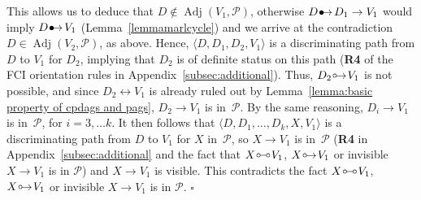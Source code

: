 \documentclass[11pt,a4paper]{article}
\newenvironment{proofof}[1][]{\begin{trivlist}
   \item[\hskip \labelsep {\bfseries Proof of #1.}]}{\hfill{}$\square$\end{trivlist}}
\DeclareMathOperator{\Adj}{Adj}
\newcommand{\g}[1][G]{\mathcal{#1}}
\newcommand{\bulletarrow}{
  \setlength{\unitlength}{1mm}
  \begin{picture}(5,1)(0,0)
    \put(0.2,0){$\bullet$}
    \put(1,0){$\rightarrow$}
  \end{picture}
}
\newcommand{\circarrow}{
  \setlength{\unitlength}{1mm}
  \begin{picture}(5,1)(0,0)
    \put(1,1){\circle{1}}
    \put(1.2,0){$\rightarrow$}
  \end{picture}
}
\newcommand{\circcirc}{
  \setlength{\unitlength}{1mm}
  \begin{picture}(5,1)(0,0)
    \put(1,1){\circle{1}}
    \put(1.5,1){\line(1,0){2}}
    \put(4,1){\circle{1}}
  \end{picture}
}
\begin{document}
\begin{proofof}[Lemma~\ref{lemmadirectedpath}]
  This allows us to deduce that $D \notin \Adj(V_1,\g[P])$, otherwise $D \bulletarrow D_1 \to V_1$ would imply $D \bulletarrow V_1$ (Lemma~\ref{lemmamarlcycle}) and we arrive at the contradiction $D \in \Adj(V_2,\g[P])$, as above.
   Hence, $\langle D, D_1, D_{2}, V_1 \rangle$ is a discriminating path from $D$ to $V_1$ for $D_2$, implying that $D_2$ is of definite status on this path (\textbf{R4} of the FCI orientation rules in Appendix~\ref{subsec:additional}). Thus, $D_2 \circarrow V_1$ is not possible, and since $D_2 \leftrightarrow V_{1}$ is already ruled out by Lemma~\ref{lemma:basic property of cpdags and pags}, $D_2 \to V_{1}$ is in~$\g[P]$. By the same reasoning, $D_i \to V_1$ is in~$\g[P]$, for $i = 3, \dots k$.
   It then follows that $\langle D, D_1, \dots ,D_k, X, V_1 \rangle $ is a discriminating path from $D$ to $V_1$ for $X$ in~$\g[P]$, so $X \to V_1$ is in~$\g[P]$ (\textbf{R4} in Appendix~\ref{subsec:additional} and the fact that $X \circcirc V_1$, $X \circarrow V_1$ or invisible $X \rightarrow V_1$ is in $\g[P]$) and $X \to V_1$ is visible. This contradicts the fact $X \circcirc V_1$, $X \circarrow V_1$ or invisible $X \rightarrow V_1$ is in $\g[P]$.
\end{proofof}
\end{document}
